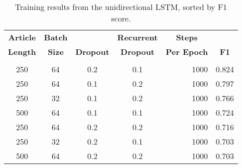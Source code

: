 \begin{table}[H]
    \centering
    \caption{Training results from the unidirectional LSTM, sorted by F1 score.}
    \label{tab:unires}
    \begin{tabular}{c|c|c|c|r|c}
    \multicolumn{1}{c}{\textbf{Article}}   & \multicolumn{1}{|c}{\textbf{Batch}}  & \multicolumn{1}{|c}{}                     & \multicolumn{1}{|c}{\textbf{Recurrent}}        & \multicolumn{1}{|c}{\textbf{Steps}}     &  \multicolumn{1}{|c}{}  \\
    \multicolumn{1}{c}{\textbf{Length}}    & \multicolumn{1}{|c}{\textbf{Size}}       & \multicolumn{1}{|c}{\textbf{Dropout}} & \multicolumn{1}{|c}{\textbf{Dropout}}          & \multicolumn{1}{|c}{\textbf{Per Epoch}} & \multicolumn{1}{|c}{\textbf{F1}} \\
    \hline 
    &&&&& \\
    250                                & 64                             & 0.2                         & 0.1                                  & 1000                                & 0.824                  \\
    250                                & 64                             & 0.1                         & 0.2                                  & 1000                                & 0.797                  \\
    250                                & 32                             & 0.1                         & 0.2                                  & 1000                                & 0.766                  \\
    500                                & 64                             & 0.1                         & 0.1                                  & 1000                                & 0.724                  \\
    250                                & 64                             & 0.2                         & 0.2                                  & 1000                                & 0.716                  \\
    250                                & 32                             & 0.2                         & 0.1                                  & 1000                                & 0.703                  \\
    500                                & 64                             & 0.2                         & 0.2                                  & 1000                                & 0.703                  \\

\end{tabular}
\end{table}
